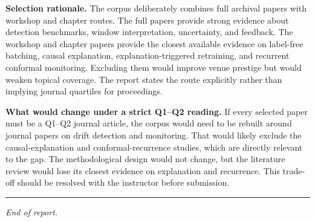 \documentclass[
]{article}
\begin{document}
\textbf{Selection rationale.} The corpus deliberately combines full
archival papers with workshop and chapter routes. The full papers
provide strong evidence about detection benchmarks, window
interpretation, uncertainty, and feedback. The workshop and chapter
papers provide the closest available evidence on label-free batching,
causal explanation, explanation-triggered retraining, and recurrent
conformal monitoring. Excluding them would improve venue prestige but
would weaken topical coverage. The report states the route explicitly
rather than implying journal quartiles for proceedings.

\textbf{What would change under a strict Q1--Q2 reading.} If every
selected paper must be a Q1--Q2 journal article, the corpus would need
to be rebuilt around journal papers on drift detection and monitoring.
That would likely exclude the causal-explanation and
conformal-recurrence studies, which are directly relevant to the gap.
The methodological design would not change, but the literature review
would lose its closest evidence on explanation and recurrence. This
trade-off should be resolved with the instructor before submission.

\begin{center}\rule{0.5\linewidth}{0.5pt}\end{center}

\emph{End of report.}
\end{document}
